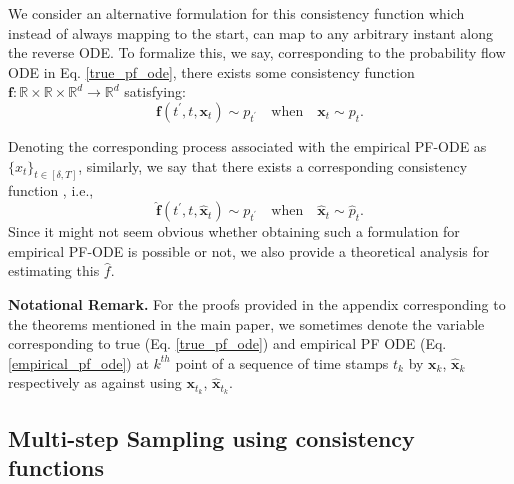 \documentclass[11pt]{article}
\newcommand{\xh}[1]{\textcolor[HTML]{66CCFF}{#1}}
\def\rvx{{\mathbf{x}}}
\def\vf{{\bm{f}}}
\newcommand{\R}{\mathbb{R}}
\begin{document}
\noindent
We consider an alternative formulation for this consistency function which instead of always mapping to the start, can map to any arbitrary instant along the reverse ODE. To formalize this, we say, corresponding to the probability flow ODE in Eq. \ref{true_pf_ode}, there exists some consistency function $\vf\colon \R\times \R\times \R^d \rightarrow \R^d$ satisfying: 
\begin{equation*}
        \vf(t^\prime,t, \rvx_t)\sim p_{t^\prime}\quad \mathrm{when}\quad  \rvx_t\sim p_t.
\end{equation*}

Denoting the corresponding process associated with the empirical PF-ODE as $\{\hat{x}_t\}_{t\in [\delta,T]}$, similarly, we say that there exists a corresponding consistency function
, i.e.,
\begin{equation*}
    \hat{\vf}(t^\prime,t, \hat{\rvx}_t)\sim p_{t^\prime}\quad \mathrm{when}\quad \hat{\rvx}_t\sim \hat{p}_t.
\end{equation*} 
Since it might not seem obvious whether obtaining such a formulation for empirical PF-ODE is possible or not, we also provide a theoretical analysis for estimating this $\hat{f}$.

\noindent
\textbf{Notational Remark.} For the proofs provided in the appendix corresponding to the theorems mentioned in the main paper, we sometimes denote the variable corresponding to true (Eq. \ref{true_pf_ode}) and empirical PF ODE (Eq. \ref{empirical_pf_ode}) at $k^{th}$ point of a sequence of time stamps $t_k$ by $\rvx_{k}$, $\hat{\rvx}_k$ respectively as against using $\rvx_{t_k}$, $\hat{\rvx}_{t_k}$. \\


\subsection{Multi-step Sampling using consistency functions}
\label{subsec_3_multi_step_algo}
\end{document}
